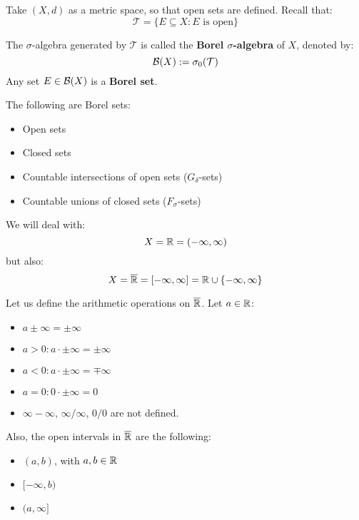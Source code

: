 Take $(X, d)$ as a metric space, so that open sets are defined. Recall that:
$$\mathcal{T} = \{E \subseteq X: E \text{ is open}\}$$

\begin{fdefinition}
    The $\sigma$-algebra generated by $\mathcal{T}$ is called the \textbf{Borel $\sigma$-algebra} of $X$,
    denoted by:
    $$\mathcal{B}(X) := \sigma_0(\mathcal{T})$$
    Any set $E \in \mathcal{B}(X)$ is a \textbf{Borel set}.
\end{fdefinition}

\begin{fremark}
    The following are Borel sets:

    \begin{itemize}
        \item Open sets
        \item Closed sets
        \item Countable intersections of open sets ($G_{\delta}$-sets)
        \item Countable unions of closed sets ($F_\sigma$-sets)
    \end{itemize}
\end{fremark}

\vspace{1em}

We will deal with:
$$X = \mathbb{R} = (-\infty, \infty)$$
but also:
$$X = \overline{\mathbb{R}} = [-\infty, \infty] = \mathbb{R} \cup \{-\infty, \infty\}$$

Let us define the arithmetic operations on $\overline{\mathbb{R}}$. Let $a \in \mathbb{R}$:

\begin{itemize}
    \item $a \pm \infty = \pm \infty$
    \item $a > 0: a \cdot \pm \infty = \pm \infty$
    \item $a < 0: a \cdot \pm \infty = \mp \infty$
    \item $a = 0: 0 \cdot \pm \infty = 0$
    \item $\infty - \infty$, $\infty/\infty$, $0/0$ are not defined.
\end{itemize}

Also, the open intervals in $\overline{\mathbb{R}}$ are the following:

\begin{itemize}
    \item $(a, b)$, with $a, b \in \mathbb{R}$
    \item $[-\infty, b)$
    \item $(a, \infty]$ 
\end{itemize}

